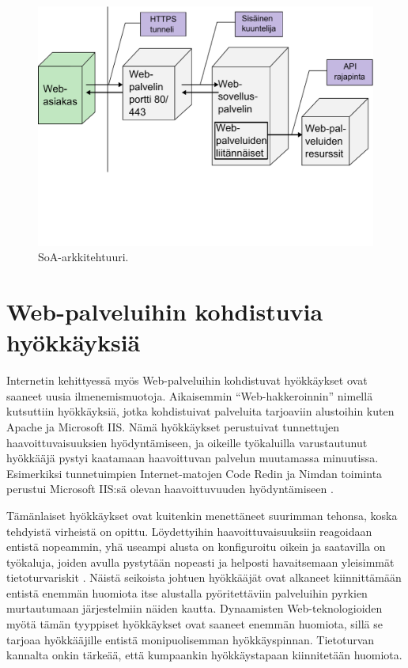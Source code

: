 \begin{figure}[htp]
\centering
\includegraphics[width=12cm]{pics/soa_arkkitehtuuri.pdf}
\caption{SoA-arkkitehtuuri.}
\label{soa}
\end{figure}

\newpage

\section{Web-palveluihin kohdistuvia hyökkäyksiä}

Internetin kehittyessä myös Web-palveluihin kohdistuvat hyökkäykset ovat saaneet
uusia ilmenemismuotoja. Aikaisemmin ``Web-hakkeroinnin'' nimellä kutsuttiin
hyökkäyksiä, jotka kohdistuivat palveluita tarjoaviin alustoihin kuten Apache ja 
Microsoft IIS. Nämä hyökkäykset perustuivat tunnettujen haavoittuvaisuuksien
hyödyntämiseen, ja oikeille työkaluilla varustautunut hyökkääjä pystyi kaatamaan haavoittuvan
palvelun muutamassa minuutissa. Esimerkiksi tunnetuimpien Internet-matojen Code Redin ja Nimdan toiminta
perustui Microsoft IIS:sä olevan haavoittuvuuden hyödyntämiseen \cite{Hacking}. 

Tämänlaiset hyökkäykset ovat kuitenkin menettäneet suurimman tehonsa, koska tehdyistä virheistä on opittu. Löydettyihin 
haavoittuvaisuuksiin reagoidaan entistä nopeammin, yhä useampi alusta on konfiguroitu oikein ja saatavilla on työkaluja, joiden
avulla pystytään nopeasti ja helposti havaitsemaan yleisimmät tietoturvariskit \cite{Hacking}. Näistä seikoista johtuen
hyökkääjät ovat alkaneet kiinnittämään entistä enemmän huomiota itse alustalla pyöritettäviin palveluihin pyrkien 
murtautumaan järjestelmiin näiden kautta. Dynaamisten Web-teknologioiden myötä tämän tyyppiset hyökkäykset ovat saaneet
enemmän huomiota, sillä se tarjoaa hyökkääjille entistä monipuolisemman hyökkäyspinnan. Tietoturvan 
kannalta onkin tärkeää, että kumpaankin hyökkäystapaan kiinnitetään huomiota.

